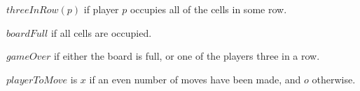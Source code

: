 \documentclass{../lib}
\begin{document}
\begin{ledDef}
\end{ledDef}

\begin{ledCmnt}
$threeInRow(p)$ if player $p$ occupies all of the cells in some row.
\end{ledCmnt}

\begin{ledDef}
\end{ledDef}

\begin{ledCmnt}
$boardFull$ if all cells are occupied.
\end{ledCmnt}

\begin{ledDef}
\end{ledDef}

\begin{ledCmnt}
$gameOver$ if either the board is full, or one of the players three in a row.
\end{ledCmnt}

\begin{ledDef}
\end{ledDef}

\begin{ledCmnt}
$playerToMove$ is $x$ if an even number of moves have been made, and $o$ otherwise.
\end{ledCmnt}

\begin{ledDef}
\end{ledDef}

\begin{ledDef}
\end{ledDef}
\end{document}
